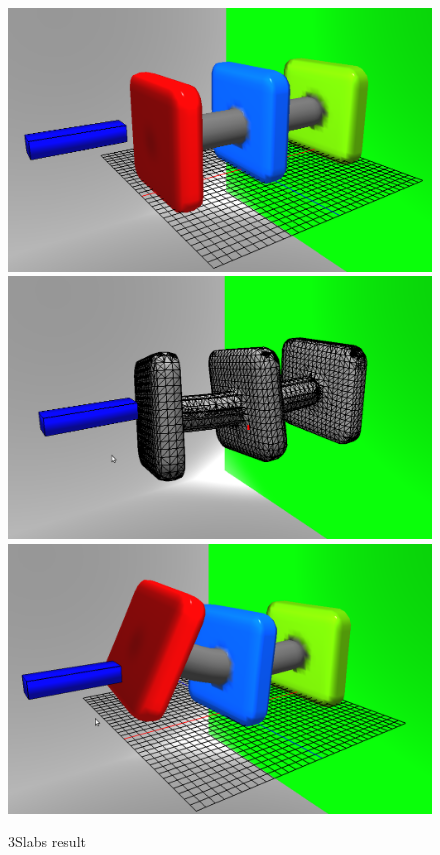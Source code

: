\begin{figure}[H]
  \centering
  \includegraphics[width=0.30\linewidth]{figures/deformable/shots/3slabs01.png}
  \includegraphics[width=0.30\linewidth]{figures/deformable/shots/3slabs02.png}
  \includegraphics[width=0.30\linewidth]{figures/deformable/shots/3slabs03.png}
 
  \caption{\label{fig:3slabs}
  {3Slabs result}
}
\end{figure}

